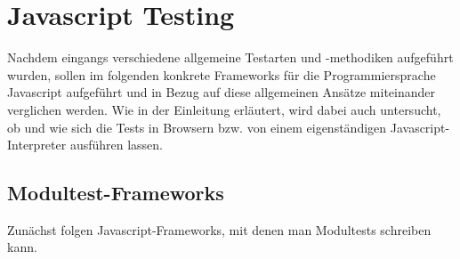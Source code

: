 \section{Javascript Testing}
Nachdem eingangs verschiedene allgemeine Testarten und -methodiken aufgeführt wurden, sollen im folgenden konkrete Frameworks für die Programmiersprache Javascript aufgeführt und in Bezug auf diese allgemeinen Ansätze miteinander verglichen werden. Wie in der Einleitung erläutert, wird dabei auch untersucht, ob und wie sich die Tests in Browsern bzw. von einem eigenständigen Javascript-Interpreter ausführen lassen.

\subsection{Modultest-Frameworks}
Zunächst folgen Javascript-Frameworks, mit denen man Modultests schreiben kann.

